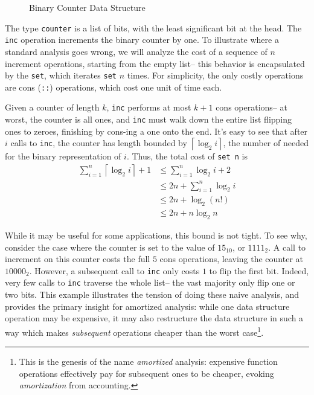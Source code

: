\begin{figure}
  
  \caption{Binary Counter Data Structure}
  \label{fig:bin-counter}
\end{figure}

The type \texttt{counter} is a list of bits, with the least significant bit at the head. The \texttt{inc} operation increments the binary counter by one. To illustrate where a standard analysis goes wrong, we will analyze the cost of a sequence of $n$ increment operations, starting from the empty list-- this behavior is encapsulated by the \texttt{set}, which iterates \texttt{set} $n$ times. For simplicity, the only costly operations are cons (\texttt{::}) operations, which cost one unit of time each.

Given a counter of length $k$, \texttt{inc} performs at most $k + 1$ cons operations-- at worst, the counter is all ones, and \texttt{inc} must walk down the entire list flipping ones to zeroes, finishing by cons-ing a one onto the end. It's easy to see that after $i$ calls to \texttt{inc}, the counter has length bounded by $\left \lceil{\log_2 i}\right \rceil$, the number of needed for the binary representation of $i$. Thus, the total cost of \texttt{set n} is
\begin{align*}
  \sum_{i=1}^n \left\lceil{\log_2 i}\right \rceil + 1
  &\leq \sum_{i=1}^n \log_2 i + 2\\
  &\leq 2n + \sum_{i=1}^n \log_2 i\\
  &\leq 2n + \log_2(n!)\\
  &\leq 2n + n\log_2 n
\end{align*}

While it may be useful for some applications, this bound is not tight. To see why, consider the case where the counter is set to the value of $15_{10}$, or $1111_2$. A  call to increment on this counter costs the full $5$ cons operations, leaving the counter at $10000_2$. However, a subsequent call to \texttt{inc} only costs $1$ to flip the first bit. Indeed, very few calls to \texttt{inc} traverse the whole list-- the vast majority only flip one or two bits. This example illustrates the tension of doing these naive analysis, and provides the primary insight for amortized analysis: while one data structure operation may be expensive, it may also restructure the data structure in such a way which makes \textit{subsequent} operations cheaper than the worst case\footnote{
This is the genesis of the name \textit{amortized} analysis: expensive function operations effectively pay for subsequent ones to be cheaper, evoking \textit{amortization} from accounting.
}.

